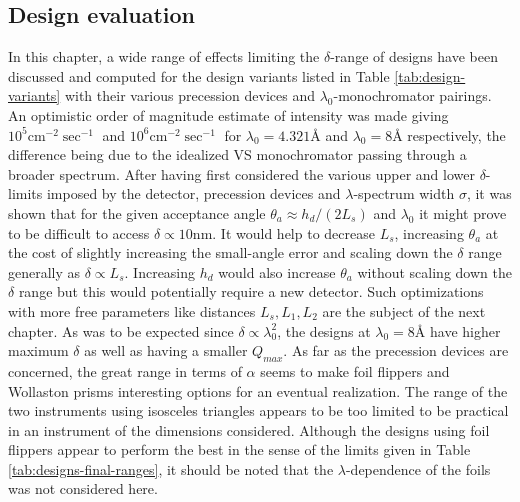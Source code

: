 \documentclass{article}
\begin{document}
\subsection{Design evaluation}
In this chapter, a wide range of effects limiting the $\delta$-range of designs have been discussed and computed for the design variants listed in Table \ref{tab:design-variants} with their various precession devices and $\lambda_0$-monochromator pairings. An optimistic order of magnitude estimate of intensity was made giving $10^5 \unit{\centi\meter^{-2}\sec^{-1}}$ and $10^6 \unit{\centi\meter^{-2}\sec^{-1}}$ for $\lambda_0 = 4.321$Å and $\lambda_0 = 8$Å respectively, the difference being due to the idealized VS monochromator passing through a broader spectrum. After having first considered the various upper and lower $\delta$-limits imposed by the detector, precession devices and $\lambda$-spectrum width $\sigma$, it was shown that for the given acceptance angle $\theta_a \approx h_d/(2L_s)$ and $\lambda_0$ it might prove to be difficult to access $\delta\propto 10\unit{\nano\meter}$. It would help to decrease $L_s$, increasing $\theta_a$ at the cost of slightly increasing the small-angle error and scaling down the $\delta$ range generally as $\delta \propto L_s$. Increasing $h_d$ would also increase $\theta_a$ without scaling down the $\delta$ range but this would potentially require a new detector. Such optimizations with more free parameters like distances $L_s, L_1, L_2$ are the subject of the next chapter. As was to be expected since $\delta \propto \lambda_0^2$, the designs at $\lambda_0 = 8$Å have higher maximum $\delta$ as well as having a smaller $Q_{max}$. As far as the precession devices are concerned, the great range in terms of $\alpha$ seems to make foil flippers and Wollaston prisms interesting options for an eventual realization. The range of the two instruments using isosceles triangles appears to be too limited to be practical in an instrument of the dimensions considered. Although the designs using foil flippers appear to perform the best in the sense of the limits given in Table \ref{tab:designs-final-ranges}, it should be noted that the $\lambda$-dependence \cite{kraan2003} of the foils was not considered here.

\newpage
\end{document}
